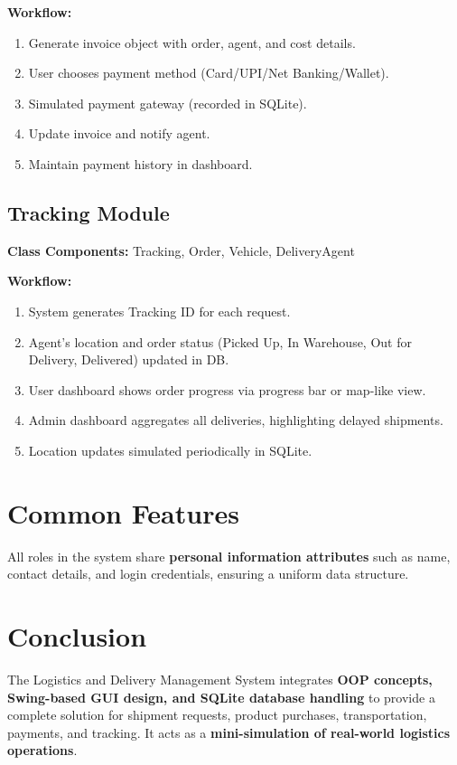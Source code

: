 \documentclass[12pt,a4paper]{article}
\begin{document}
\textbf{Workflow:}
\begin{enumerate}[leftmargin=*,noitemsep]
  \item Generate invoice object with order, agent, and cost details.
  \item User chooses payment method (Card/UPI/Net Banking/Wallet).
  \item Simulated payment gateway (recorded in SQLite).
  \item Update invoice and notify agent.
  \item Maintain payment history in dashboard.
\end{enumerate}

\subsection{Tracking Module}
\textbf{Class Components:} Tracking, Order, Vehicle, DeliveryAgent

\textbf{Workflow:}
\begin{enumerate}[leftmargin=*,noitemsep]
  \item System generates Tracking ID for each request.
  \item Agent’s location and order status (Picked Up, In Warehouse, Out for Delivery, Delivered) updated in DB.
  \item User dashboard shows order progress via progress bar or map-like view.
  \item Admin dashboard aggregates all deliveries, highlighting delayed shipments.
  \item Location updates simulated periodically in SQLite.
\end{enumerate}

\section{Common Features}
All roles in the system share \textbf{personal information attributes} such as name, contact details, and login credentials, ensuring a uniform data structure.

\section{Conclusion}
The Logistics and Delivery Management System integrates \textbf{OOP concepts, Swing-based GUI design, and SQLite database handling} to provide a complete solution for shipment requests, product purchases, transportation, payments, and tracking. It acts as a \textbf{mini-simulation of real-world logistics operations}.
\end{document}
